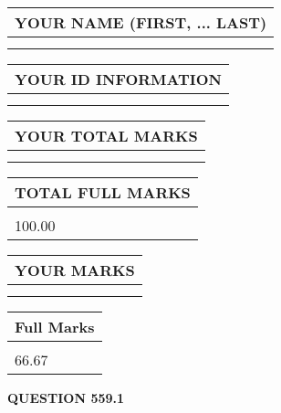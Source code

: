 \documentclass{ctexart}
\begin{document}
   
   
   
\newpage 
\setcounter{page}{ 
   559001 } 
   
   
   
   
\noindent\begin{tabular}{|l|}
\hline
YOUR NAME (FIRST, ... LAST)  \\
\hline
 \\ 
 \\ 
\hline
\end{tabular}
\hspace{0.05in} \begin{tabular}{|l|}
\hline
 YOUR   ID   INFORMATION  \\
\hline
 \\ 
 \\ 
\hline
\end{tabular}
   
   
\vspace{0.2in}\noindent\begin{tabular}{|l|}
\hline
YOUR TOTAL MARKS  \\
\hline
 \\ 
 \\ 
\hline
\end{tabular}
\hspace{0.05in} \begin{tabular}{|l|}
\hline
TOTAL FULL MARKS  \\
\hline
 \\ 
100.00 \\
\hline
\end{tabular}
   
   
 \vspace{0.2in}
 
 
 
 
   
   
  
\vspace{0.2in}
  
\noindent\begin{tabular}{|l|}
\hline
 YOUR MARKS  \\
\hline
 \\ 
 \\ 
\hline
\end{tabular}
\hspace{0.05in} \begin{tabular}{|l|}
\hline
 Full Marks  \\
\hline
 \\ 
66.67 \\
\hline
\end{tabular}
{\textbf{\Large{QUESTION
559.1 
}}}
  
\end{document}

